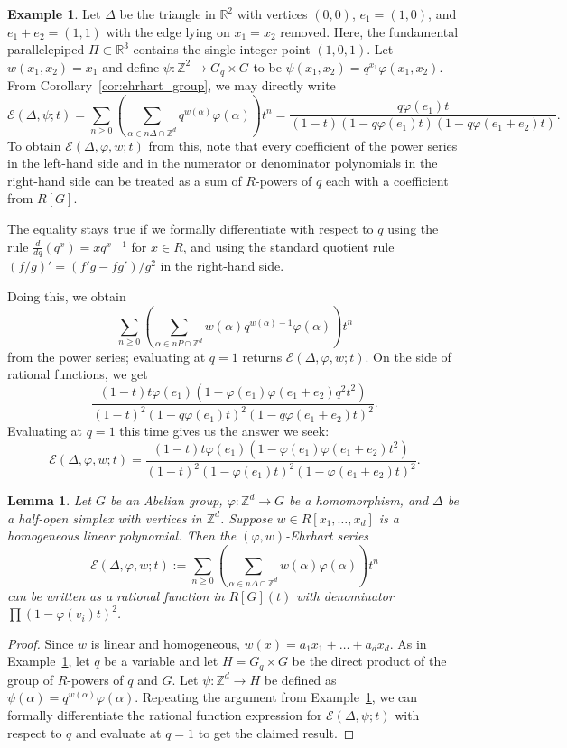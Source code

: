 \documentclass[12pt,reqno]{amsart}
\newtheorem{lem}[thm]{Lemma}
\theoremstyle{definition}
\newtheorem{exam}[thm]{Example}
\theoremstyle{remark}
\newcommand{\R}{\mathbb{R}}
\newcommand{\Z}{\mathbb{Z}}
\renewcommand{\phi}{\varphi}
\begin{document}
\begin{exam}\label{ex:triangle-polynomial}
    Let $\Delta$ be the triangle in $\R^2$ with vertices $(0,0)$, $e_1 = (1,0)$, and $e_1 + e_2 = (1,1)$ with the edge lying on $x_1 = x_2$ removed.
    Here, the fundamental parallelepiped $\Pi\subset \R^3$ contains the single integer point $(1,0,1)$.
    Let $w(x_1,x_2) = x_1$ and define $\psi: \Z^2 \to G_q \times G$ to be $\psi(x_1,x_2) = q^{x_1}\varphi(x_1,x_2)$.
    From Corollary~\ref{cor:ehrhart_group}, we may directly write
    \[
        \mathcal{E}(\Delta, \psi;t) = \sum_{n\geq 0}\left(\sum_{\alpha\in n\Delta\cap \Z^d}q^{w(\alpha)}\phi(\alpha)\right)t^n = \frac{q\varphi(e_1) t}{(1-t)(1-q\phi(e_1)t)(1-q\varphi(e_1+e_2)t)}.
    \]
    To obtain $\mathcal{E}(\Delta, \varphi, w;t)$ from this, note that every coefficient of the power series in the left-hand side and in the numerator or denominator polynomials in the right-hand side can be treated as a sum of $R$-powers of $q$ each with a coefficient from $R[G]$. 
    
    The equality stays true if we formally differentiate with respect to $q$ using the rule $\frac{d}{dq}\left(q^x\right)=xq^{x-1}$ for $x\in R$, and using the standard quotient rule $(f/g)'=(f'g-fg')/g^2$ in the right-hand side.

    Doing this, we obtain 
    $$\sum_{n\geq 0}\left(\sum_{\alpha\in nP\cap \Z^d}w(\alpha)q^{w(\alpha)-1}\phi(\alpha)\right)t^n$$
    from the power series; evaluating at $q = 1$ returns $\mathcal{E}(\Delta,\varphi,w;t)$.
    On the side of rational functions, we get
    \[
        \frac{(1-t)t\varphi(e_1)(1-\varphi(e_1)\varphi(e_1+e_2)q^2t^2)}{(1-t)^2(1-q\phi(e_1)t)^2(1-q\varphi(e_1+e_2)t)^2}.
    \]
    Evaluating at $q=1$ this time gives us the answer we seek:
    \[
        \mathcal{E}(\Delta,\varphi,w;t) = \frac{(1-t)t\varphi(e_1)(1-\varphi(e_1)\varphi(e_1+e_2)t^2)}{(1-t)^2(1-\phi(e_1)t)^2(1-\varphi(e_1+e_2)t)^2}.
    \]
\end{exam}

\begin{lem}\label{lem:weighted_group}
Let $G$ be an Abelian group, $\phi:\Z^d\to G$ be a homomorphism, and $\Delta$ be a half-open simplex with vertices in $\Z^d$. Suppose $w\in R[x_1,\ldots,x_d]$ is a homogeneous linear polynomial. Then 
the $(\phi,w)$-Ehrhart series 
$$\mathcal E(\Delta,\phi,w;t):=\sum_{n\geq 0} \left(\sum_{\alpha\in n\Delta\cap \Z^d}w(\alpha)\phi(\alpha)\right)t^n$$
can be written as a rational function in $R[G](t)$ with denominator $\prod (1-\phi(v_i)t)^2$. 
\end{lem}
\begin{proof}
Since $w$ is linear and homogeneous, $w(x)=a_1x_1+\ldots+a_dx_d$.
As in Example~\ref{ex:triangle-polynomial}, let $q$ be a variable and let $H=G_q\times G$ be the direct product of the group of $R$-powers of $q$ and $G$. Let $\psi:\Z^d\to H$ be defined as $\psi(\alpha)=q^{w(\alpha)}\phi(\alpha)$.
Repeating the argument from Example~\ref{ex:triangle-polynomial}, we can formally differentiate the rational function expression for $\mathcal{E}(\Delta,\psi;t)$ with respect to $q$ and evaluate at $q=1$ to get the claimed result.
\end{proof}
\end{document}
